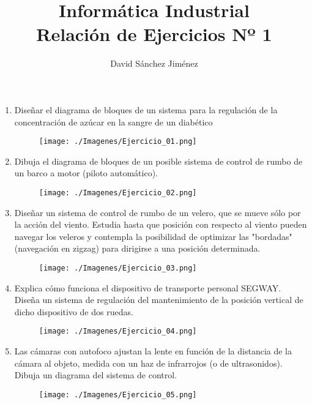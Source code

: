 \documentclass[10pt,a4paper,spanish]{article}
\begin{document}
  \setcounter{section}{0}
  \title{\huge\bf Informática Industrial \\ Relación de Ejercicios Nº 1}
  \author{\large David Sánchez Jiménez}
  \maketitle
  \vspace{3cm}

  \begin{enumerate}
    \item Diseñar el diagrama de bloques de un sistema para la regulación de la concentración de azúcar en la sangre de un diabético
    \begin{figure}[!hbp]
      \centering  \texttt{[image: ./Imagenes/Ejercicio\_01.png]}
    \end{figure}

    \item Dibuja el diagrama de bloques de un posible sistema de control de rumbo de un barco a motor (piloto automático).
    \begin{figure}[!hbp]
      \centering  \texttt{[image: ./Imagenes/Ejercicio\_02.png]}
    \end{figure}

    \newpage
    \item Diseñar un sistema de control de rumbo de un velero, que se mueve sólo por la acción del viento. Estudia hasta que posición con respecto al viento pueden navegar los veleros y contempla la posibilidad de optimizar las "bordadas" (navegación en zigzag) para dirigirse a una posición determinada.
    \begin{figure}[!hbp]
      \centering  \texttt{[image: ./Imagenes/Ejercicio\_03.png]}
    \end{figure}

    \item Explica cómo funciona el dispositivo de transporte personal SEGWAY. Diseña un sistema de regulación del mantenimiento de la posición vertical de dicho dispositivo de dos ruedas.
    \begin{figure}[!hbp]
      \centering  \texttt{[image: ./Imagenes/Ejercicio\_04.png]}
    \end{figure}

    \newpage
    \item Las cámaras con autofoco ajustan la lente en función de la distancia de la cámara al objeto, medida con un haz de infrarrojos (o de ultrasonidos). Dibuja un diagrama del sistema de control.
    \begin{figure}[!hbp]
      \centering  \texttt{[image: ./Imagenes/Ejercicio\_05.png]}
    \end{figure}


\end{enumerate}
\end{document}
